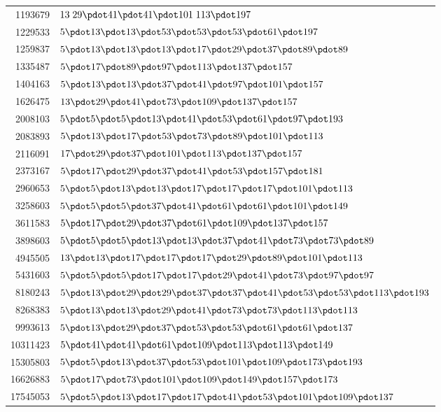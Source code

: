 \begin{longtable}{@{}r|l@{}}
1193679 & $13\;29\pdot 41\pdot 41\pdot 101\;113\pdot 197$\\
1229533 & $5\pdot 13\pdot 13\pdot 53\pdot 53\pdot 53\pdot 61\pdot 197$\\
1259837 & $5\pdot 13\pdot 13\pdot 13\pdot 17\pdot 29\pdot 37\pdot 89\pdot 89$\\
1335487 & $5\pdot 17\pdot 89\pdot 97\pdot 113\pdot 137\pdot 157$\\
1404163 & $5\pdot 13\pdot 13\pdot 37\pdot 41\pdot 97\pdot 101\pdot 157$\\
1626475 & $13\pdot 29\pdot 41\pdot 73\pdot 109\pdot 137\pdot 157$\\
2008103 & $5\pdot 5\pdot 5\pdot 13\pdot 41\pdot 53\pdot 61\pdot 97\pdot 193$\\
2083893 & $5\pdot 13\pdot 17\pdot 53\pdot 73\pdot 89\pdot 101\pdot 113$\\
2116091 & $17\pdot 29\pdot 37\pdot 101\pdot 113\pdot 137\pdot 157$\\
2373167 & $5\pdot 17\pdot 29\pdot 37\pdot 41\pdot 53\pdot 157\pdot 181$\\
2960653 & $5\pdot 5\pdot 13\pdot 13\pdot 17\pdot 17\pdot 17\pdot 101\pdot 113$\\
3258603 & $5\pdot 5\pdot 5\pdot 37\pdot 41\pdot 61\pdot 61\pdot 101\pdot 149$\\
3611583 & $5\pdot 17\pdot 29\pdot 37\pdot 61\pdot 109\pdot 137\pdot 157$\\
3898603 & $5\pdot 5\pdot 5\pdot 13\pdot 13\pdot 37\pdot 41\pdot 73\pdot 73\pdot 89$\\
4945505 & $13\pdot 13\pdot 17\pdot 17\pdot 17\pdot 29\pdot 89\pdot 101\pdot 113$\\
5431603 & $5\pdot 5\pdot 5\pdot 17\pdot 17\pdot 29\pdot 41\pdot 73\pdot 97\pdot 97$\\
8180243 & $5\pdot 13\pdot 29\pdot 29\pdot 37\pdot 37\pdot 41\pdot 53\pdot 53\pdot 113\pdot 193$\\
8268383 & $5\pdot 13\pdot 13\pdot 29\pdot 41\pdot 73\pdot 73\pdot 113\pdot 113$\\
9993613 & $5\pdot 13\pdot 29\pdot 37\pdot 53\pdot 53\pdot 61\pdot 61\pdot 137$\\
10311423 & $5\pdot 41\pdot 41\pdot 61\pdot 109\pdot 113\pdot 113\pdot 149$\\
15305803 & $5\pdot 5\pdot 13\pdot 37\pdot 53\pdot 101\pdot 109\pdot 173\pdot 193$\\
16626883 & $5\pdot 17\pdot 73\pdot 101\pdot 109\pdot 149\pdot 157\pdot 173$\\
17545053 & $5\pdot 5\pdot 13\pdot 17\pdot 17\pdot 41\pdot 53\pdot 101\pdot 109\pdot 137$\\

\end{longtable}
